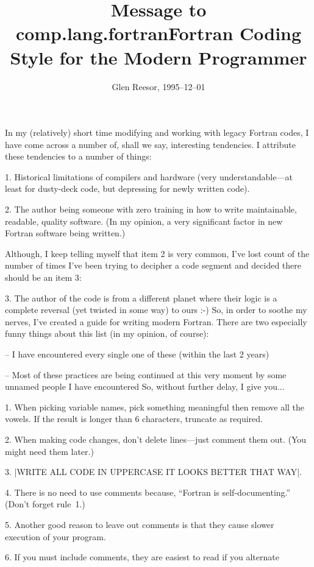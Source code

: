 \leavevmode\vskip 0.25in
\title{Message to comp.lang.fortran}
\subtitle{Glen Reesor, 1995--12--01}
\vskip 0.5in
\noindent In my (relatively) short time modifying and working with
legacy Fortran codes, I have come across a number of, shall we say,
interesting tendencies.  I attribute these tendencies to a number of
things:
\startlist%
\item{1.}%
  Historical limitations of compilers and hardware (very
  understandable---at least for dusty-deck code, but depressing
  for newly written code).
\item{2.}%
  The author being someone with zero training in how to write 
  maintainable, readable, quality software.  (In my opinion, a very
  significant factor in new Fortran software being written.)
\item{}%
  Although, I keep telling myself that item 2 is very common, I've
  lost count of the number of times I've been trying to decipher
  a code segment and decided there should be an item 3:
\item{3.}%
  The author of the code is from a different planet where their logic
  is a complete reversal (yet twisted in some way) to ours :-)
\endlist
So, in order to soothe my nerves, I've created a guide for writing
modern Fortran.  There are two especially funny things about this list
(in my opinion, of course):
\startlist%
\item{--}%
  I have encountered every single one of these (within the last 2 years)
\item{--}%
  Most of these practices are being continued at this very moment by
  some unnamed people I have encountered
\endlist
So, without further delay, I give you...
\bigskip\title{Fortran Coding Style for the Modern Programmer}
\startlist%
\item{1.} When picking variable names, pick something meaningful then remove all 
   the vowels.  If the result is longer than 6 characters, truncate as 
   required.
\item{2.} When making code changes, don't delete lines---just comment them out.
   (You might need them later.)
\item{3.} |WRITE ALL CODE IN UPPERCASE IT LOOKS BETTER THAT WAY|.
\item{4.} There is no need to use comments because,
``Fortran is self-documenting.'' (Don't forget rule~1.)
\item{5.} Another good reason to leave out comments is that they cause slower
   execution of your program.
\item{6.} If you must include comments, they are easiest to read if you alternate
